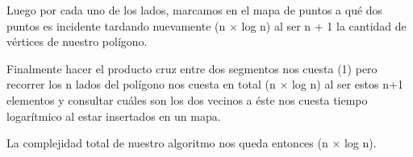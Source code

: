 Luego por cada uno de los lados, marcamos en el mapa de puntos a qué dos puntos es incidente tardando nuevamente \bigo(n $\times$ log n) al ser n + 1 la cantidad de vértices de nuestro polígono.\newline

Finalmente hacer el producto cruz entre dos segmentos nos cuesta \bigo(1) pero recorrer los n lados del polígono nos cuesta en total \bigo(n $\times$ log n) al ser estos n+1 elementos y consultar cuáles son los dos vecinos a éste nos cuesta tiempo logarítmico al estar insertados en un mapa.\newline

La complejidad total de nuestro algoritmo nos queda entonces \bigo(n $\times$ log n).\newline